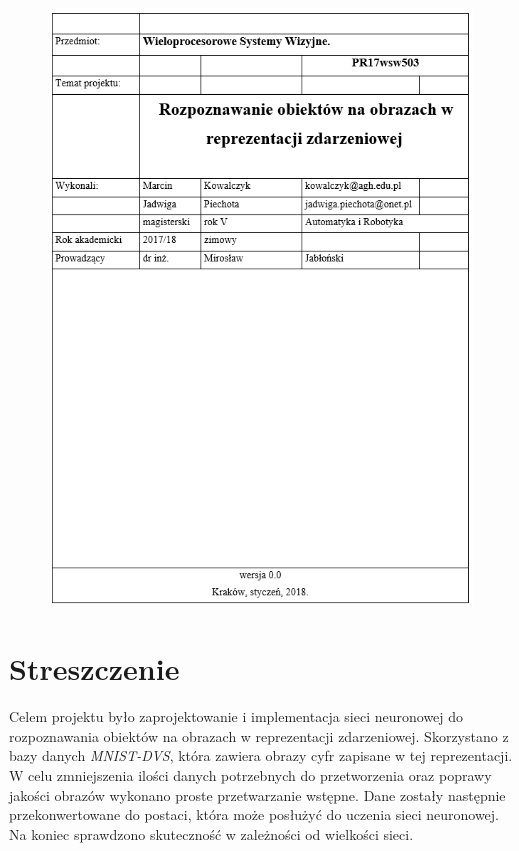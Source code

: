 \documentclass[11pt,a4paper,titlepage]{article}
\begin{document}


\begin{center}
\begin{figure}[H]
	\centering
	\includegraphics[scale=1]{obrazki/wstep}
\end{figure}
\end{center}

\section*{Streszczenie}
Celem projektu było zaprojektowanie i implementacja sieci neuronowej do rozpoznawania obiektów na obrazach w reprezentacji zdarzeniowej. Skorzystano z bazy danych \textit{MNIST-DVS}, która zawiera obrazy cyfr zapisane w tej reprezentacji. W celu zmniejszenia ilości danych potrzebnych do przetworzenia oraz poprawy jakości obrazów wykonano proste przetwarzanie wstępne. Dane zostały następnie przekonwertowane do postaci, która może posłużyć do uczenia sieci neuronowej. Na koniec sprawdzono skuteczność w zależności od wielkości sieci.
 
\clearpage
\tableofcontents
\clearpage












\appendix
\nocite{*}
\printbibliography
{}
\end{document}
